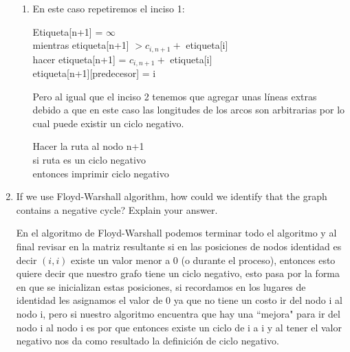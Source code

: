 \documentclass{report}
\begin{document}
\begin{enumerate}
\begin{enumerate}[1)]
      \item En este caso repetiremos el inciso 1:
      \begin{center}
        Etiqueta[n+1] = $\infty$ \\ 
        mientras etiqueta[n+1]  $> c_{i,n+1} + $ etiqueta[i] \\
        hacer etiqueta[n+1] = $c_{i,n+1} + $ etiqueta[i] \\
        etiqueta[n+1][predecesor] = i
      \end{center}

      Pero al igual que el inciso 2 tenemos que agregar unas líneas extras debido a que en este caso las longitudes de los arcos son arbitrarias por lo cual puede existir un ciclo negativo.

      \begin{center}
        Hacer la ruta al nodo n+1 \\
        si ruta es un ciclo negativo \\
        entonces imprimir ciclo negativo
      \end{center}

    \end{enumerate}

    \item If we use Floyd-Warshall algorithm, how could we identify that the graph contains a negative cycle? Explain your answer.
    
    En el algoritmo de Floyd-Warshall podemos terminar todo el algoritmo y al final revisar en la matriz resultante si en las posiciones de nodos identidad es decir $(i,i)$ existe un valor menor a 0 (o durante el proceso), entonces esto quiere decir que nuestro grafo tiene un ciclo negativo, esto pasa por la forma en que se inicializan estas posiciones, si recordamos en los lugares de identidad les asignamos el valor de 0 ya que no tiene un costo ir del nodo i al nodo i, pero si nuestro algoritmo encuentra que hay una ``mejora" para ir del nodo i al nodo i es por que entonces existe un ciclo de i a i y al tener el valor negativo nos da como resultado la definición de ciclo negativo.






\end{enumerate}
\end{document}
